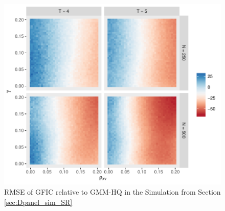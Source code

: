 \begin{figure}
\centering
\includegraphics[scale = 0.8]{./simulations/DynamicPanel/results/Dpanel_GFIC_RMSE_rel_HQ}
\caption{RMSE of GFIC relative to GMM-HQ in the Simulation from Section \ref{sec:Dpanel_sim_SR}}
\end{figure}


